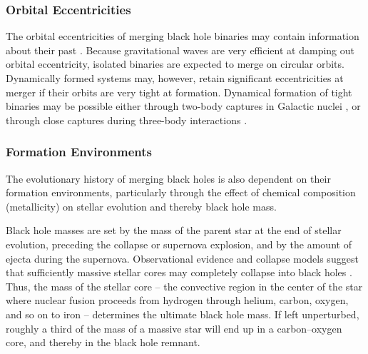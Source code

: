 \documentclass[iop,onecolumn]{revtex4}
\begin{document}
\subsubsection{Orbital Eccentricities}
	The orbital eccentricities of merging black hole binaries may contain information about their past \citep{MandelOShaughnessy:2010}. Because gravitational waves are very efficient at damping out orbital eccentricity, isolated binaries are expected to merge on circular orbits. Dynamically formed systems may, however, retain significant eccentricities at merger if their orbits are very tight at formation. Dynamical formation of tight binaries may be possible either through two-body captures in Galactic nuclei \citep{OLeary:2008} \citep[but see][]{Tsang:2013}, or through close captures during three-body interactions \citep{Samsing:2014, Rodriguez:2018}. 


\subsubsection{Formation Environments}
\label{environ}
The evolutionary history of merging black holes is also dependent on their formation environments, particularly through the effect of chemical composition (metallicity) on stellar evolution and thereby black hole mass.

Black hole masses are set by the mass of the parent star at the end of stellar evolution, preceding the collapse or supernova explosion, and by the amount of ejecta during the supernova. Observational evidence and collapse models suggest that sufficiently massive stellar cores may completely collapse into black holes \citep[for a review, see][]{Mirabel:2016}. Thus, the mass of the stellar core -- the convective region in the center of the star where nuclear fusion proceeds from hydrogen through helium, carbon, oxygen, and so on to iron -- determines the ultimate black hole mass.  If left unperturbed, roughly a third of the mass of a massive star will end up in a carbon--oxygen core, and thereby in the black hole remnant.
\end{document}
